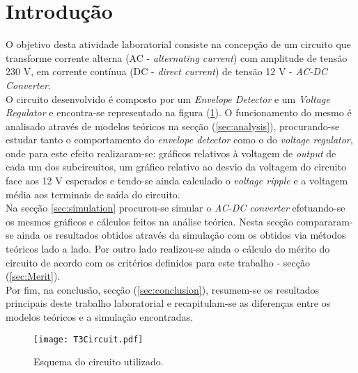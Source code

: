\clearpage

\section{Introdução}
\label{sec:introduction}

O objetivo desta atividade laboratorial consiste na concepção de um circuito que transforme corrente alterna (AC - \emph{alternating current}) com
amplitude de tensão 230 V, em corrente contínua (DC - \emph{direct current}) de tensão 12 V  - \emph{AC-DC Converter}.
\\
O circuito desenvolvido é composto por um \emph{Envelope Detector} e um \emph{Voltage Regulator} e encontra-se representado na figura (\ref{fig:circuito}).
O funcionamento do mesmo é analisado através de modelos teóricos na secção (\ref{sec:analysis}), procurando-se estudar tanto o comportamento
do \emph{envelope detector} como o do \emph{voltage regulator}, onde para este efeito realizaram-se: gráficos relativos à voltagem de \emph{output} 
de cada um dos subcircuitos, um gráfico relativo ao desvio da voltagem do circuito face aos 12 V esperados e tendo-se ainda calculado o
\emph{voltage ripple} e a voltagem média aos terminais de saída do circuito.
\\
Na secção \ref{sec:simulation} procurou-se simular o \emph{AC-DC converter} efetuando-se os mesmos gráficos e cálculos feitos na análise teórica. 
Nesta secção compararam-se ainda os resultados obtidos através da simulação com os obtidos via métodos teóricos lado a lado.
Por outro lado realizou-se ainda o cálculo do mérito do circuito de acordo com os critérios definidos para este trabalho - secção (\ref{sec:Merit}).
\\
Por fim, na conclusão, secção (\ref{sec:conclusion}), resumem-se os resultados principais deste trabalho laboratorial e recapitulam-se as diferenças
entre os modelos teóricos e a simulação encontradas.

\begin{figure}[H] \centering
    \texttt{[image: T3Circuit.pdf]}
    \caption{Esquema do circuito utilizado.}
    \label{fig:circuito}
\end{figure}
